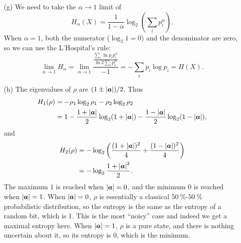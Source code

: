 \documentclass[hyperref, a4paper]{article}
\begin{document}
\begin{itemize}
\item[(g)] We need to take the $\alpha \to 1$ limit of 
\begin{equation}
    H_\alpha(X) = \frac{1}{1 - \alpha} \log_2 \left( \sum_i p_i^\alpha \right) .
\end{equation}
When $\alpha = 1$, both the numerator ($\log_2 1 = 0$) and the denominator are zero,
so we can use the L'Hospital's rule:
\[
    \lim_{\alpha \to 1} H_{\alpha} = \lim_{\alpha \to 1} \frac{\frac{\sum_{i} \ln p_i p_i^\alpha}{\ln 2 \sum_{i} p_i^\alpha}}{-1}
    = - \sum_i p_i \log p_i = H(X).
\]

\item[(h)] The eigenvalues of $\rho$ are $(1 \pm \abs{\vb*{a}}) / 2$.
Thus 
\begin{equation}
    \begin{aligned}
        H_1(\rho) &= - \rho_1 \log_2 \rho_1 - \rho_2 \log_2 \rho_2 \\
        &= 1 - \frac{1 + \abs{\vb*{a}}}{2} \log_2 (1 + \abs{\vb*{a}})
        - \frac{1 - \abs{\vb*{a}}}{2} \log_2 (1 - \abs{\vb*{a}}),
    \end{aligned}
\end{equation}
and 
\begin{equation}
    \begin{aligned}
        H_2 (\rho) &= - \log_2 \left( \frac{(1 + \abs{\vb*{a}})^2}{4} + \frac{(1 - \abs{\vb*{a}})^2}{4} \right) \\
        &= - \log_2 \frac{1 + \abs{\vb*{a}}^2}{2}.
    \end{aligned}
\end{equation}
The maximum $1$ is reached when $\abs{\vb*{a}} = 0$,
and the minimum $0$ is reached when $\abs{\vb*{a}} = 1$.
When $\abs{\vb*{a}} = 0$, 
$\rho$ is essentially a classical $\SI{50}{\percent}$-$\SI{50}{\percent}$ probabilistic distribution,
so the entropy is the same as the entropy of a random bit, which is 1.
This is the most ``noisy'' case and indeed we get a maximal entropy here.
When $\abs{\vb*{a}} = 1$, $\rho$ is a pure state,
and there is nothing uncertain about it, so its entropy is 0, which is the minimum.

\end{itemize}
\end{document}
